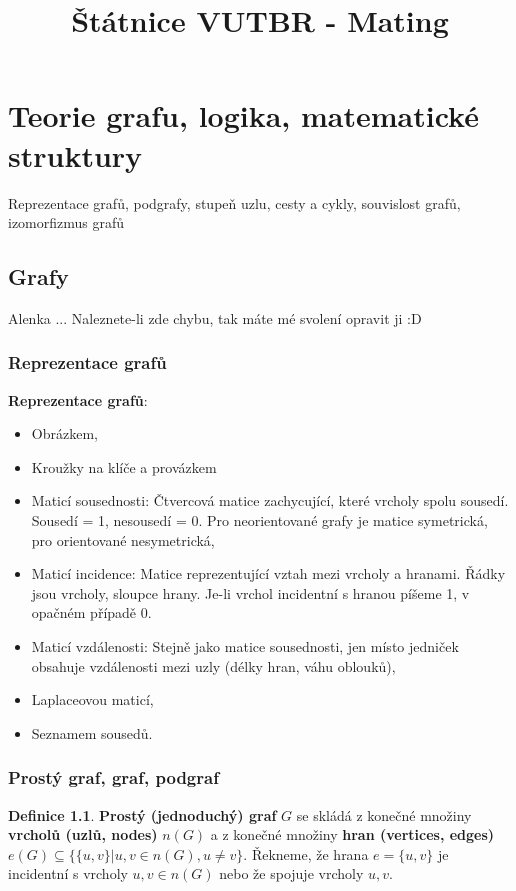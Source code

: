 \documentclass[a4]{report}
\theoremstyle{definition}
\newtheorem{definition}{Definice}[section]
\begin{document}
\title{Štátnice VUTBR - Mating}
\maketitle

\tableofcontents

\chapter{Teorie grafu, logika, matematické struktury}
Reprezentace grafů, podgrafy, stupeň uzlu, cesty a cykly, souvislost grafů, izomorfizmus grafů\\
\section{Grafy}
Alenka ... Naleznete-li zde chybu, tak máte mé svolení opravit ji :D
\subsection{Reprezentace grafů}

\textbf{Reprezentace grafů}:
\begin{itemize}
    \item Obrázkem,
    \item Kroužky na klíče a provázkem
    \item Maticí sousednosti: Čtvercová matice zachycující, které vrcholy spolu sousedí. Sousedí = 1, nesousedí = 0. Pro neorientované grafy je matice symetrická, pro orientované nesymetrická,
    \item Maticí incidence: Matice reprezentující vztah mezi vrcholy a hranami. Řádky jsou vrcholy, sloupce hrany. Je-li vrchol incidentní s hranou píšeme 1, v opačném případě 0.
    \item Maticí vzdálenosti: Stejně jako matice sousednosti, jen místo jedniček obsahuje vzdálenosti mezi uzly (délky hran, váhu oblouků),
    \item Laplaceovou maticí,
    \item Seznamem sousedů.
\end{itemize}

\subsection{Prostý graf, graf, podgraf}

\begin{definition}
\textbf{Prostý (jednoduchý) graf} $G$ se skládá z konečné množiny \textbf{vrcholů (uzlů, nodes)} $n(G)$ a z konečné množiny \textbf{hran (vertices, edges)} $e(G)  \subseteq \{ \{ u, v \} | u,v \in n(G), u \neq v \}$. Řekneme, že hrana $e = \{ u, v \}$ je incidentní s vrcholy $u,v \in n(G)$ nebo že spojuje vrcholy $u,v$.
\end{definition}
\end{document}

